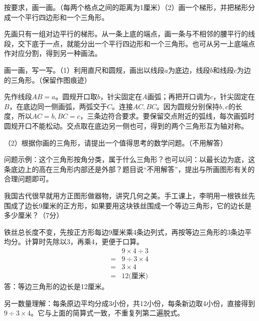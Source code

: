 按要求，画一画。（每两个格点之间的距离为1厘米）（2）画一个梯形，并把梯形分成一个平行四边形和一个三角形。\par
{}
\begin{BookAnswer}
先画只有一组对边平行的梯形。从一条上底的端点，画一条与不相邻的腰平行的线段，交下底于一点，就能分出一个平行四边形和一个三角形。也可从另一上底端点作对应分割，得到另一种画法。
\end{BookAnswer}

画一画，写一写。（1）利用直尺和圆规，画出以线段\(a\)为底边，线段\(b\)和线段\(c\)为边的三角形。（保留作图痕迹）\par
{}
\begin{BookAnswer}
先作线段\(AB=a\)。圆规开口取\(b\)，针尖固定在\(A\)画弧；再把开口调为\(c\)，针尖固定在\(B\)，在底边同一侧画弧，两弧交于\(C\)。连接\(AC,BC\)。因为圆规分别保持\(b,c\)的长度，所以\(AC=b,BC=c\)，三条边符合要求。要保留交点附近的弧线，每次画弧时圆规开口不能松动。交点取在底边另一侧也可，得到的两个三角形互为轴对称。
\end{BookAnswer}

（2）根据你画的三角形，请提出一个值得思考的数学问题。（不用解答）\par
\begin{BookAnswer}
问题示例：这个三角形按角分类，属于什么三角形？也可以问：以最长边为底，这条底边上的高在三角形内部还是外部？题目说“不用解答”，提出与所画图形有关的合理问题即可。
\end{BookAnswer}

我国古代很早就用方正图形做器物，讲究几何之美。手工课上，李明用一根铁丝先围成了边长9厘米的正方形，如果要用这块铁丝围成一个等边三角形，它的边长是多少厘米？（7分）\par
\begin{BookAnswer}
铁丝总长度不变，先按正方形每边9厘米乘4条边列式，再按等边三角形的3条边平均分。计算时先除以3，再乘4，更便于口算。\[\begin{aligned}&9\times4\div3\\={}&9\div3\times4\\={}&3\times4\\={}&12\text{(厘米)}\end{aligned}\]答：等边三角形的边长是12厘米。\par 另一数量理解：每条原边平均分成3小份，共12小份，每条新边取4小份，直接得到\(9\div3\times4\)。它与上面的简算式一致，不重复列第二遍脱式。
\end{BookAnswer}

